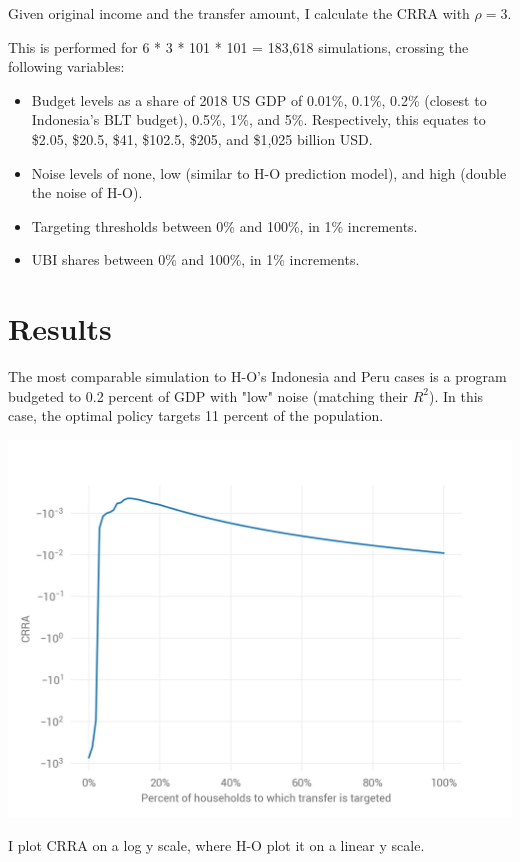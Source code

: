 \documentclass[12pt]{article}
\begin{document}
Given original income and the transfer amount, I calculate the CRRA with 
$\rho=3$.

This is performed for 6 * 3 * 101 * 101 = 183,618 simulations, crossing the 
following variables:

\begin{itemize}
	
	\item Budget levels as a share of 2018 US GDP of 0.01\%, 0.1\%, 0.2\% 
	(closest to 
	Indonesia's BLT budget), 0.5\%, 1\%, and 5\%. Respectively, this equates to 
	\$2.05, \$20.5, \$41, \$102.5, \$205, and \$1,025 billion USD.
	
	\item Noise levels of none, low (similar to H-O prediction model), and high 
	(double the noise of H-O).
	
	\item Targeting thresholds between 0\% and 100\%, in 1\% increments.
	
	\item UBI shares between 0\% and 100\%, in 1\% increments.
	
\end{itemize}


\section{Results} \label{sec:results}

The most comparable simulation to H-O's Indonesia and Peru cases is a program 
budgeted to 0.2 percent of GDP with "low" noise (matching their $R^2$). In this 
case, the optimal policy targets 11 percent of the population. 

\begin{center}
\includegraphics{single_plot_0_2_0_Low_noise}  %
\label{fig:single_plot_0_2_0_Low_noise}
\medskip %
\begin{minipage}{0.65\textwidth} %
	{\footnotesize I plot CRRA on a log y scale, where H-O plot it on a 
	linear y scale.\par}
\end{minipage}
\end{center}
\end{document}
